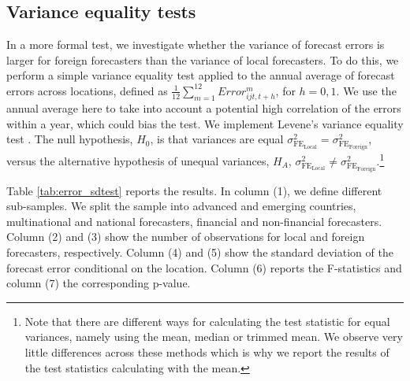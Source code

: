 
\subsection{Variance equality tests}
\label{app:sec:variance}

In a more formal test, we investigate whether the variance of forecast errors is larger for foreign forecasters than the variance of local forecasters. To do this, we perform a simple variance equality test applied to the annual average of forecast errors across locations, defined as $\frac{1}{12}\sum_{m=1}^{12} Error_{ijt,t+h}^m$, for $h=0,1$. We use the annual average here to take into account a potential high correlation of the errors within a year, which could bias the test. We implement Levene’s variance equality test \citep{levene1960robust}. The null hypothesis, $H_0$, is that variances are equal $\sigma^2_{\text{FE}_{\text{Local}}} = \sigma^2_{\text{FE}_{\text{Foreign}}}$, versus the alternative hypothesis of unequal variances,  $H_A$, $\sigma^2_{\text{FE}_{\text{Local}}} \neq \sigma^2_{\text{FE}_{\text{Foreign}}}$.\footnote{Note that there are different ways for calculating the test statistic for equal variances, namely using the mean, median or trimmed mean. We observe very little differences across these methods which is why we report the results of the test statistics calculating with the mean.}



{

}

Table \ref{tab:error_sdtest} reports the results. In column (1), we define different sub-samples. We split the sample into advanced and emerging countries, multinational and national forecasters, financial and non-financial forecasters. Column (2) and (3) show the number of observations for local and foreign forecasters, respectively. Column (4) and (5) show the standard deviation of the forecast error conditional on the location. Column (6) reports the F-statistics and column (7) the corresponding p-value.


